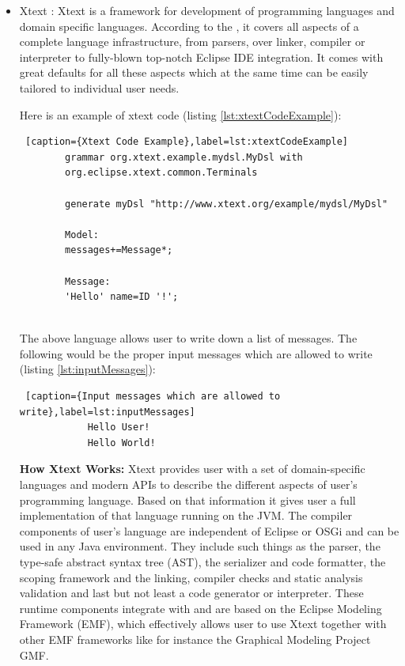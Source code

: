 \begin{itemize}	
	\item Xtext : Xtext is a framework for development of programming languages and domain specific languages. According to the \cite{ref_17_xtext:grammar}, it covers all aspects of a complete language infrastructure, from parsers, over linker, compiler or interpreter to fully-blown top-notch Eclipse IDE integration. It comes with great defaults for all these aspects which at the same time can be easily tailored to individual user needs.
	
	Here is an example of xtext code (listing \ref{lst:xtextCodeExample}):
		\begin{lstlisting} [caption={Xtext Code Example},label=lst:xtextCodeExample]
		grammar org.xtext.example.mydsl.MyDsl with 
		org.eclipse.xtext.common.Terminals
		
		generate myDsl "http://www.xtext.org/example/mydsl/MyDsl"
		
		Model:
		messages+=Message*;
		
		Message:
		'Hello' name=ID '!';
		
		\end{lstlisting}
		 
	The above language allows user to write down a list of messages. The following would be the proper input messages which are allowed to write (listing \ref{lst:inputMessages}):
		\begin{lstlisting} [caption={Input messages which are allowed to write},label=lst:inputMessages]
			Hello User!
			Hello World!		
		\end{lstlisting}
		
	\textbf{How Xtext Works:}
	Xtext provides user with a set of domain-specific languages and modern APIs to describe the different aspects of user's programming language. Based on that information it gives user a full implementation of that language running on the JVM. The compiler components of user's language are independent of Eclipse or OSGi and can be used in any Java environment. They include such things as the parser, the type-safe abstract syntax tree (AST), the serializer and code formatter, the scoping framework and the linking, compiler checks and static analysis validation and last but not least a code generator or interpreter. These runtime components integrate with and are based on the Eclipse Modeling Framework (EMF), which effectively allows user to use Xtext together with other EMF frameworks like for instance the Graphical Modeling Project GMF.
	

\end{itemize}
